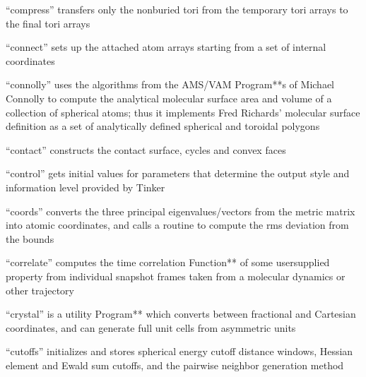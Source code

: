 \documentclass[letterpaper,11pt,english]{sphinxmanual}
\begin{document}

“compress” transfers only the non\sphinxhyphen{}buried tori from the temporary tori arrays to the final tori arrays


“connect” sets up the attached atom arrays starting from a set of internal coordinates


“connolly” uses the algorithms from the AMS/VAM Program**s of Michael Connolly to compute the analytical molecular surface area and volume of a collection of spherical atoms; thus it implements Fred Richards’ molecular surface definition as a set of analytically defined spherical and toroidal polygons


“contact” constructs the contact surface, cycles and convex faces


“control” gets initial values for parameters that determine the output style and information level provided by Tinker


“coords” converts the three principal eigenvalues/vectors from the metric matrix into atomic coordinates, and calls a routine to compute the rms deviation from the bounds


“correlate” computes the time correlation Function** of some user\sphinxhyphen{}supplied property from individual snapshot frames taken from a molecular dynamics or other trajectory






“crystal” is a utility Program** which converts between fractional and Cartesian coordinates, and can generate full unit cells from asymmetric units


“cutoffs” initializes and stores spherical energy cutoff distance windows, Hessian element and Ewald sum cutoffs, and the pairwise neighbor generation method
\end{document}
